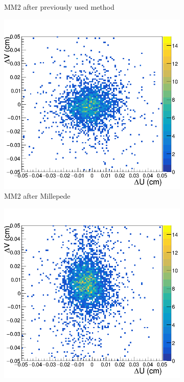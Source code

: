 \begin{figure}[h!]
\begin{subfigure}[l]{.45\textwidth}
   \caption{MM2 after previously used method}
   \label{fig:MX2_after_prev}
 \end{subfigure}
 \begin{subfigure}[r]{.45\textwidth}
   \centering
   \includegraphics[width=\linewidth]{thesis_figures/alignment/Run_3211_after_millepede/square/MX2.png}
   \caption{MM2 after Millepede}
 \end{subfigure}
 \begin{subfigure}[l]{.45\textwidth}
   \centering
   \includegraphics[width=\linewidth]{thesis_figures/alignment/Run_3211_after_prev/square/MX3.png}


\end{subfigure}
\end{figure}
